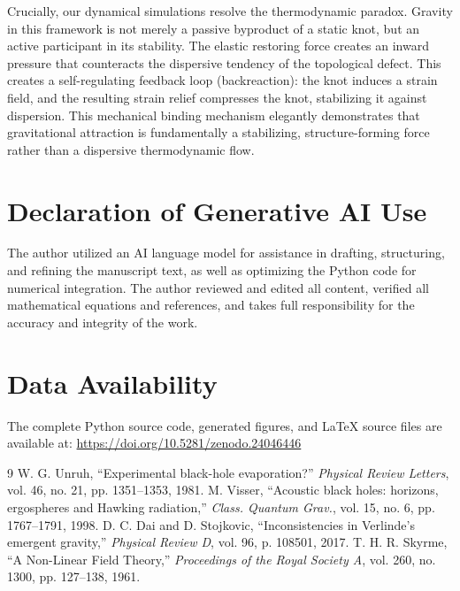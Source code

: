\documentclass[11pt,a4paper]{article}
\begin{document}
Crucially, our dynamical simulations resolve the thermodynamic paradox. Gravity in this framework is not merely a passive byproduct of a static knot, but an active participant in its stability. The elastic restoring force creates an inward pressure that counteracts the dispersive tendency of the topological defect. This creates a self-regulating feedback loop (backreaction): the knot induces a strain field, and the resulting strain relief compresses the knot, stabilizing it against dispersion. This mechanical binding mechanism elegantly demonstrates that gravitational attraction is fundamentally a stabilizing, structure-forming force rather than a dispersive thermodynamic flow.

\section*{Declaration of Generative AI Use}
The author utilized an AI language model for assistance in drafting, structuring, and refining the manuscript text, as well as optimizing the Python code for numerical integration. The author reviewed and edited all content, verified all mathematical equations and references, and takes full responsibility for the accuracy and integrity of the work.

\section*{Data Availability}
The complete Python source code, generated figures, and LaTeX source files are available at: \url{https://doi.org/10.5281/zenodo.24046446}


\begin{thebibliography}{9}
 W. G. Unruh, ``Experimental black-hole evaporation?'' \textit{Physical Review Letters}, vol. 46, no. 21, pp. 1351--1353, 1981.
 M. Visser, ``Acoustic black holes: horizons, ergospheres and Hawking radiation,'' \textit{Class. Quantum Grav.}, vol. 15, no. 6, pp. 1767--1791, 1998.
 D. C. Dai and D. Stojkovic, ``Inconsistencies in Verlinde's emergent gravity,'' \textit{Physical Review D}, vol. 96, p. 108501, 2017.
 T. H. R. Skyrme, ``A Non-Linear Field Theory,'' \textit{Proceedings of the Royal Society A}, vol. 260, no. 1300, pp. 127--138, 1961.
\end{thebibliography}
\end{document}
